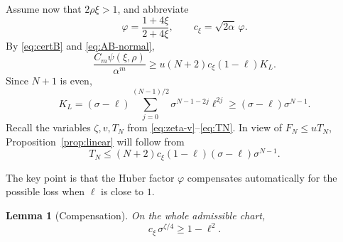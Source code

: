 \documentclass[11pt]{article}
\newtheorem{lemma}[theorem]{Lemma}
\begin{document}
Assume now that $2\rho\xi>1$, and abbreviate
\begin{equation}\label{eq:varphi-c}
        \varphi=\frac{1+4\xi}{2+4\xi},
        \qquad c_\xi=\sqrt{2\alpha}\,\varphi.
\end{equation}
By \eqref{eq:certB} and \eqref{eq:AB-normal},
\begin{equation}\label{eq:linear-start}
 \frac{C_m\psi(\xi,\rho)}{\alpha^m}
 \ge u(N+2)c_\xi(1-\ell)K_L.
\end{equation}
Since $N+1$ is even,
\begin{equation}\label{eq:KL-lower}
 K_L=(\sigma-\ell)
 \sum_{j=0}^{(N-1)/2}\sigma^{N-1-2j}\ell^{2j}
 \ge(\sigma-\ell)\sigma^{N-1}.
\end{equation}
Recall the variables $\zeta,v,T_N$ from
\eqref{eq:zeta-v}--\eqref{eq:TN}.  In view of
$F_N\le uT_N$, Proposition~\ref{prop:linear} will follow from
\begin{equation}\label{eq:linear-core}
 T_N\le
 (N+2)c_\xi(1-\ell)(\sigma-\ell)\sigma^{N-1}.
\end{equation}

The key point is that the Huber factor $\varphi$ compensates automatically
for the possible loss when $\ell$ is close to $1$.

\begin{lemma}[Compensation]\label{lem:compensation}
On the whole admissible chart,
\begin{equation}\label{eq:compensation}
        c_\xi\,\sigma^{\zeta/4}\ge1-\ell^2.
\end{equation}
\end{lemma}
\end{document}

